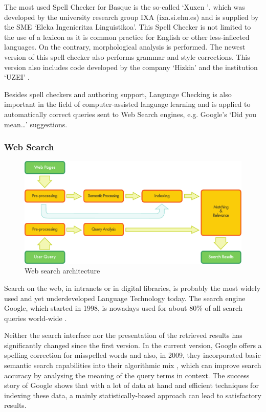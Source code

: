 \begin{multicols}{2}
The most used Spell Checker for Basque is the so-called ‘Xuxen \cite{BAS-Nota24}’, which was developed by the university research group IXA (ixa.si.ehu.es) and is supplied by the SME ‘Eleka Ingenieritza Linguistikoa’. This Spell Checker is not limited to the use of a lexicon as it is common practice for English or other less-inflected languages. On the contrary, morphological analysis is performed. The newest version of this spell checker also performs grammar and style corrections. This version also includes code developed by the company ‘Hizkia’ \cite{BAS-Nota25} and the institution ‘UZEI’ \cite{BAS-Nota26}. 

Besides spell checkers and authoring support, Language Checking is also important in the field of computer-assisted language learning and is applied to automatically correct queries sent to Web Search engines, e.g. Google’s ‘Did you mean…’ suggestions. 

\subsubsection{Web Search}
\begin{figure}[htb]
  \center
  \includegraphics[width=\textwidth]{../_media/english/web_search_architecture}
  \caption{Web search architecture}
  \label{fig:websearcharch_en}
 \end{figure}
 
    Search on the web, in intranets or in digital libraries, is probably the most widely used and yet underdeveloped Language Technology today. The search engine Google, which started in 1998, is nowadays used for about 80\% of all search queries world-wide \cite{BAS-Nota27}.
 
Neither the search interface nor the presentation of the retrieved results has significantly changed since the first version. In the current version, Google offers a spelling correction for misspelled words and also, in 2009, they incorporated basic semantic search capabilities into their algorithmic mix \cite{BAS-Nota28}, which can improve search accuracy by analysing the meaning of the query terms in context. The success story of Google shows that with a lot of data at hand and efficient techniques for indexing these data, a mainly statistically-based approach can lead to satisfactory results.
 

\end{multicols}
